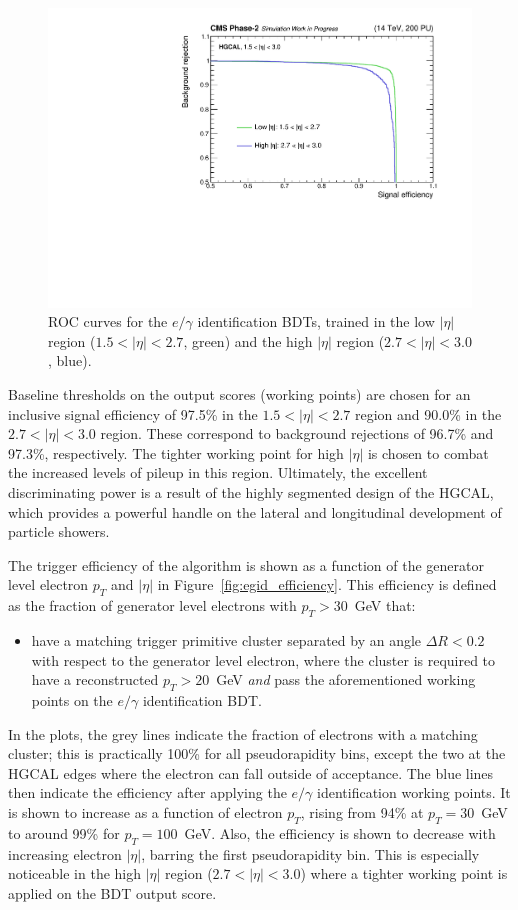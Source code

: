 \begin{figure}[htb!]
  \centering
  \includegraphics[width=.7\textwidth]{Figures/cms/egid/ROC.pdf}
  \caption[$e/\gamma$ identification ROC curve]
  {
    ROC curves for the $e/\gamma$ identification BDTs, trained in the low $|\eta|$ region ($1.5<|\eta|<2.7$, green) and the high $|\eta|$ region ($2.7<|\eta|<3.0$, blue).
  }
  \label{fig:egid_roc}
\end{figure}

Baseline thresholds on the output scores (working points) are chosen for an inclusive signal efficiency of 97.5\% in the $1.5<|\eta|<2.7$ region and 90.0\% in the $2.7<|\eta|<3.0$ region. These correspond to background rejections of 96.7\% and 97.3\%, respectively. The tighter working point for high $|\eta|$ is chosen to combat the increased levels of pileup in this region. Ultimately, the excellent discriminating power is a result of the highly segmented design of the HGCAL, which provides a powerful handle on the lateral and longitudinal development of particle showers.

The trigger efficiency of the algorithm is shown as a function of the generator level electron $p_T$ and $|\eta|$ in Figure~\ref{fig:egid_efficiency}. This efficiency is defined as the fraction of generator level electrons with $p_T>30$~GeV that:
\begin{itemize}
    \item have a matching trigger primitive cluster separated by an angle $\Delta R<0.2$ with respect to the generator level electron, where the cluster is required to have a reconstructed $p_T>20$~GeV \textit{and} pass the aforementioned working points on the $e/\gamma$ identification BDT.
\end{itemize}
\noindent
In the plots, the grey lines indicate the fraction of electrons with a matching cluster; this is practically 100\% for all pseudorapidity bins, except the two at the HGCAL edges where the electron can fall outside of acceptance. The blue lines then indicate the efficiency after applying the $e/\gamma$ identification working points. It is shown to increase as a function of electron $p_T$, rising from 94\% at $p_T=30$~GeV to around 99\% for $p_T=100$~GeV. Also, the efficiency is shown to decrease with increasing electron $|\eta|$, barring the first pseudorapidity bin. This is especially noticeable in the high $|\eta|$ region ($2.7<|\eta|<3.0$) where a tighter working point is applied on the BDT output score.

